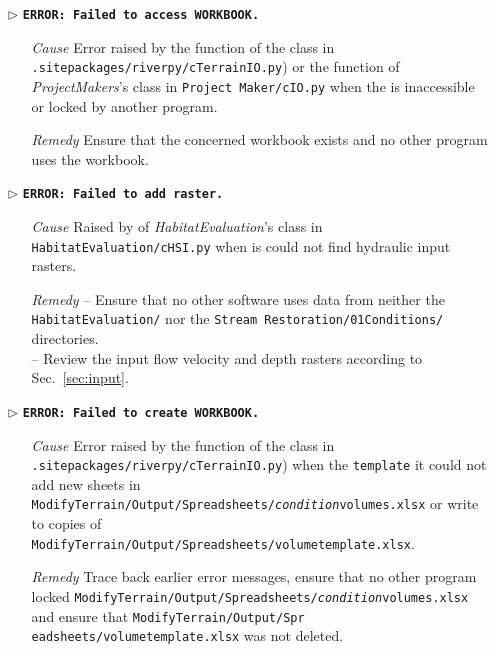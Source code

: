 \begin{itemize}
	\item[$\triangleright$]\textbf{\texttt{ERROR: Failed to access WORKBOOK.}}
	\begin{itemize}
		\item[\textit{Cause}\hspace{0.27cm}] Error raised by the  function of the  class in \texttt{.site{\myUnderscore}packages/riverpy/cTerrainIO.py}) or the  function of \textit{ProjectMakers}'s  class in \texttt{Project Maker/cIO.py} when the  is inaccessible or locked by another program.
		\item[\textit{Remedy}] Ensure that the concerned workbook exists and no other program uses the workbook.\\
	\end{itemize}
	
	\item[$\triangleright$]\textbf{\texttt{ERROR: Failed to add raster.}}
	\begin{itemize}
		\item[\textit{Cause}\hspace{0.27cm}] Raised by  of \textit{HabitatEvaluation}'s  class in \texttt{HabitatEvaluation/cHSI.py} when is could not find hydraulic input rasters.
		\item[\textit{Remedy}] -- Ensure that no other software uses data from neither the \texttt{HabitatEvaluation/} nor the \texttt{Stream Restoration/01{\myUnderscore}Conditions/} directories.\\
							 -- Review the input flow velocity and depth rasters according to Sec.~\ref{sec:input}.\\
	\end{itemize}
	
	\item[$\triangleright$]\textbf{\texttt{ERROR: Failed to create WORKBOOK.}}
	\begin{itemize}
		\item[\textit{Cause}\hspace{0.27cm}] Error raised by the  function of the  class in \texttt{.site{\myUnderscore}packages/riverpy/cTerrainIO.py}) when the \texttt{template} it could not add new sheets in \texttt{ModifyTerrain/Output/Spreadsheets/\textit{condition}{\myUnderscore}volumes.xlsx} or write to copies of \texttt{ModifyTerrain/Output/Spreadsheets/volume{\myUnderscore}template.xlsx}.
		\item[\textit{Remedy}] Trace back earlier error messages, ensure that no other program locked \texttt{ModifyTerrain/Output/Spreadsheets/\textit{condition}{\myUnderscore}volumes.xlsx} and ensure that \texttt{ModifyTerrain/Output/Spr eadsheets/volume{\myUnderscore}template.xlsx} was not deleted.\\
	\end{itemize}
	

\end{itemize}
